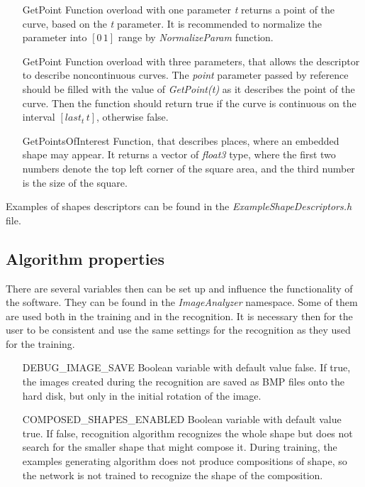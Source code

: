 \begin{description}
\begin{enumerate}
\item [GetPoint] Function overload with one parameter \emph{t} returns a point of the curve, based on the \emph{t} parameter. It is recommended to normalize the parameter into $[0\,1]$ range by \emph{NormalizeParam} function.

\item [GetPoint] Function overload with three parameters, that allows the descriptor to describe noncontinuous curves. The \emph{point} parameter passed by reference should be filled with the value of \emph{GetPoint(t)} as it describes the point of the curve. Then the function should return true if the curve is continuous on the interval $[last_t\, t]$, otherwise false.

\item [GetPointsOfInterest] Function, that describes places, where an embedded shape may appear. It returns a vector of \emph{float3} type, where the first two numbers denote the top left corner of the square area, and the third number is the size of the square.
\end{enumerate}

Examples of shapes descriptors can be found in the \emph{ExampleShapeDescriptors.h} file.

\subsection{Algorithm properties}
There are several variables then can be set up and influence the functionality of the software. They can be found in the \emph{ImageAnalyzer} namespace. Some of them are used both in the training and in the recognition. It is necessary then for the user to be consistent and use the same settings for the recognition as they used for the training.

\begin{enumerate}
\item [DEBUG\_IMAGE\_SAVE] Boolean variable with default value false. If true, the images created during the recognition are saved as BMP files onto the hard disk, but only in the initial rotation of the image.

\item [COMPOSED\_SHAPES\_ENABLED] Boolean variable with default value true. If false, recognition algorithm recognizes the whole shape but does not search for the smaller shape that might compose it. During training, the examples generating algorithm does not produce compositions of shape, so the network is not trained to recognize the shape of the composition.


\end{enumerate}
\end{description}
